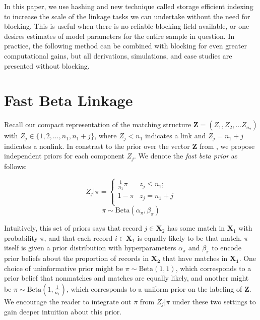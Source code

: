 \documentclass[12pt,letterpaper]{article}
\newcommand{\1}[1]{\mathbb{I}\!\left[#1\right]} %
\begin{document}
In this paper, we use hashing and new technique called storage efficient indexing to increase the scale of the linkage tasks we can undertake without the need for blocking. This is useful when there is no reliable blocking field available, or one desires estimates of model parameters for the entire sample in question. In practice, the following method can be combined with blocking for even greater computational gains, but all derivations, simulations, and case studies are presented without blocking. 

\section{Fast Beta Linkage}
\label{sec:fast-beta-linkage}

Recall our compact representation of the matching structure $\bm{Z} = (Z_1, Z_2, \ldots Z_{n_2})$ with $Z_j \in \{1,2, \ldots, n_1, n_1 + j\}$, where $Z_j < n_1$ indicates a link and $Z_j = n_1 + j$ indicates a nonlink. In constrast to the prior over the vector $\bm{Z}$ from \cite{sadinle_bayesian_2017}, we propose independent priors for each component $Z_j$. We denote the \emph{fast beta prior} as follows:


$$Z_j | \pi =
\begin{cases} 
	\frac{1}{n_1}\pi  & z_j \leq n_1; \\
	1-\pi &  z_j  = n_1 + j \\
\end{cases}$$
$$\pi \sim \text{Beta}(\alpha_{\pi}, \beta_{\pi})$$


Intuitively, this set of priors says that record $j \in \bm{X}_2$ has some match in $\bm{X}_1$ with probability $\pi$, and that each record $i \in \bm{X}_1$ is equally likely to be that match. $\pi$ itself is given a prior distribution with hyperparameters $\alpha_{\pi}$ and $\beta_{\pi}$ to encode prior beliefs about  the proportion of records in $\bm{X_2}$ that have matches in $\bm{X_1}$. One choice of uninformative prior might be \(\pi \sim \text{Beta}(1, 1)\), which corresponds to a prior belief that nonmatches and matches are equally likely, and another might be \(\pi \sim \text{Beta}\left(1, \frac{1}{n_1}\right)\), which corresponds to a uniform prior on the labeling of \(\bm{Z}\). We encourage the reader to integrate out $\pi$ from $Z_j|\pi$ under these two settings to gain deeper intuition about this prior. 
\end{document}
